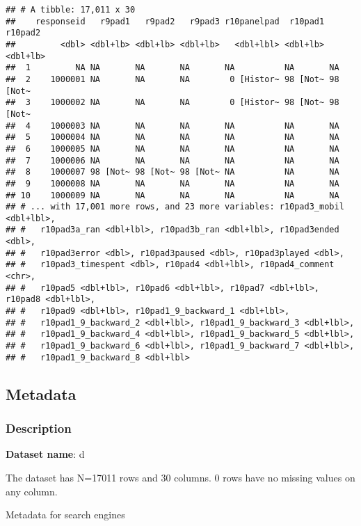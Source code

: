 \documentclass[
]{book}
\begin{document}
\begin{verbatim}
## # A tibble: 17,011 x 30
##    responseid   r9pad1   r9pad2   r9pad3 r10panelpad  r10pad1  r10pad2
##         <dbl> <dbl+lb> <dbl+lb> <dbl+lb>   <dbl+lbl> <dbl+lb> <dbl+lb>
##  1         NA NA       NA       NA       NA          NA       NA      
##  2    1000001 NA       NA       NA        0 [Histor~ 98 [Not~ 98 [Not~
##  3    1000002 NA       NA       NA        0 [Histor~ 98 [Not~ 98 [Not~
##  4    1000003 NA       NA       NA       NA          NA       NA      
##  5    1000004 NA       NA       NA       NA          NA       NA      
##  6    1000005 NA       NA       NA       NA          NA       NA      
##  7    1000006 NA       NA       NA       NA          NA       NA      
##  8    1000007 98 [Not~ 98 [Not~ 98 [Not~ NA          NA       NA      
##  9    1000008 NA       NA       NA       NA          NA       NA      
## 10    1000009 NA       NA       NA       NA          NA       NA      
## # ... with 17,001 more rows, and 23 more variables: r10pad3_mobil <dbl+lbl>,
## #   r10pad3a_ran <dbl+lbl>, r10pad3b_ran <dbl+lbl>, r10pad3ended <dbl>,
## #   r10pad3error <dbl>, r10pad3paused <dbl>, r10pad3played <dbl>,
## #   r10pad3_timespent <dbl>, r10pad4 <dbl+lbl>, r10pad4_comment <chr>,
## #   r10pad5 <dbl+lbl>, r10pad6 <dbl+lbl>, r10pad7 <dbl+lbl>, r10pad8 <dbl+lbl>,
## #   r10pad9 <dbl+lbl>, r10pad1_9_backward_1 <dbl+lbl>,
## #   r10pad1_9_backward_2 <dbl+lbl>, r10pad1_9_backward_3 <dbl+lbl>,
## #   r10pad1_9_backward_4 <dbl+lbl>, r10pad1_9_backward_5 <dbl+lbl>,
## #   r10pad1_9_backward_6 <dbl+lbl>, r10pad1_9_backward_7 <dbl+lbl>,
## #   r10pad1_9_backward_8 <dbl+lbl>
\end{verbatim}

\hypertarget{metadata-1}{%
\subsection{Metadata}\label{metadata-1}}

\hypertarget{description-1}{%
\subsubsection{Description}\label{description-1}}

\textbf{Dataset name}: d

The dataset has N=17011 rows and 30 columns.
0 rows have no missing values on any column.

Metadata for search engines
\end{document}
